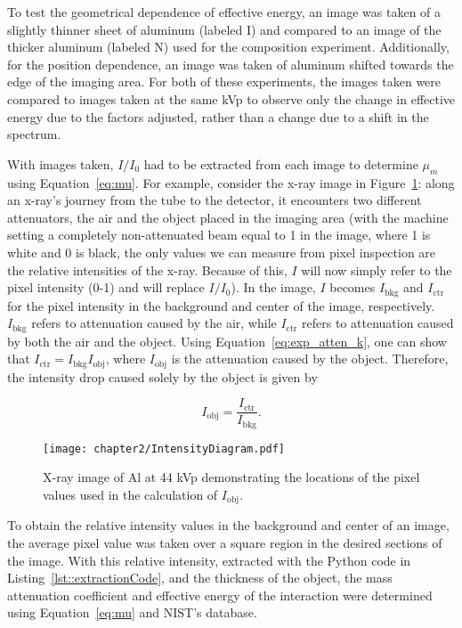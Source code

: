 \par To test the geometrical dependence of effective energy, an image was taken of a slightly thinner sheet of aluminum (labeled I) and compared to an image of the thicker aluminum (labeled N) used for the composition experiment. Additionally, for the position dependence, an image was taken of aluminum shifted towards the edge of the imaging area. For both of these experiments, the images taken were compared to images taken at the same kVp to observe only the change in effective energy due to the factors adjusted, rather than a change due to a shift in the spectrum.

\par With images taken, $I/I_0$ had to be extracted from each image to determine $\mu_m$ using Equation~\ref{eq:mu}. For example, consider the x-ray image in Figure~\ref{figure:IntensityDiagram}: along an x-ray's journey from the tube to the detector, it encounters two different attenuators, the air and the object placed in the imaging area (with the machine setting a completely non-attenuated beam equal to 1 in the image, where 1 is white and 0 is black, the only values we can measure from pixel inspection are the relative intensities of the x-ray. Because of this, $I$ will now simply refer to the pixel intensity (0-1) and will replace $I/I_0$). In the image, $I$ becomes $I_{\text{bkg}}$ and $I_{\text{ctr}}$ for the pixel intensity in the background and center of the image, respectively. $I_{\text{bkg}}$ refers to attenuation caused by the air, while $I_{\text{ctr}}$ refers to attenuation caused by both the air and the object. Using Equation~\ref{eq:exp_atten_k}, one can show that $I_{\text{ctr}} = I_{\text{bkg}} I_{\text{obj}}$, where $I_{\text{obj}}$ is the attenuation caused by the object. Therefore, the intensity drop caused solely by the object is given by

\begin{equation}
    I_{\text{obj}} = \frac{I_{\text{ctr}}}{I_{\text{bkg}}}.
	\label{eq:IObj}
\end{equation}

\begin{figure}[H]
    \centering
	\texttt{[image: chapter2/IntensityDiagram.pdf]}
	\caption{X-ray image of Al at 44 kVp demonstrating the locations of the pixel values used in the calculation of $I_{\text{obj}}$.}
	\label{figure:IntensityDiagram}
\end{figure}

\par To obtain the relative intensity values in the background and center of an image, the average pixel value was taken over a square region in the desired sections of the image. With this relative intensity, extracted with the Python code in Listing~\ref{lst::extractionCode}, and the thickness of the object, the mass attenuation coefficient and effective energy of the interaction were determined using Equation~\ref{eq:mu} and NIST's database.

